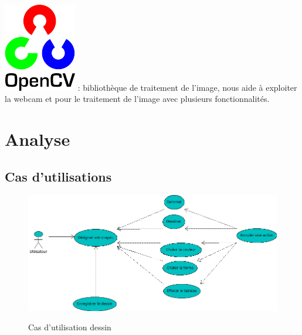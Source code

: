 \documentclass{report}
\begin{document}
			\paragraph{}
			\includegraphics[scale=1]{../logos/OpenCV_Logo.png}
			: bibliothèque de traitement de l'image, nous aide à exploiter la webcam et pour le traitement de l'image avec plusieurs fonctionnalités. \\
		
		\newpage
		\section{Analyse}
			\subsection{Cas d'utilisations}
				\begin{figure}[!h]
						\centering
						\includegraphics[scale=0.6]{../images/Dessin.png}\\
						\caption{Cas d'utilisation dessin}
						\label{Cas d'utilisation}
				\end{figure}
			\newpage
\end{document}
